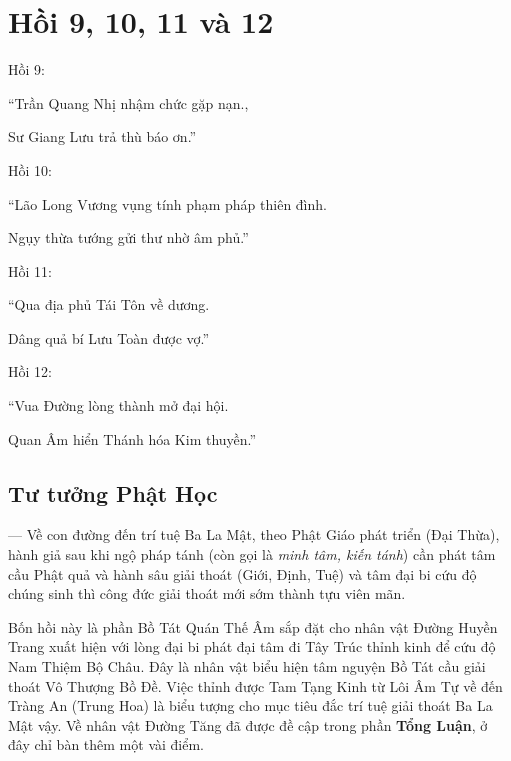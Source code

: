 \chapter{Hồi 9, 10, 11 và 12} %
\label{cha:hoi_9_10_11_và_12}
Hồi 9:

\begin{itshape}
``Trần Quang Nhị nhậm chức gặp nạn.,

Sư Giang Lưu trả thù báo ơn.''
\end{itshape}

Hồi 10:

\begin{itshape}
``Lão Long Vương vụng tính phạm pháp thiên đình.

Ngụy thừa tướng gửi thư nhờ âm phủ.''
\end{itshape}

Hồi 11:

\begin{itshape}
``Qua địa phủ Tái Tôn về dương.

Dâng quả bí Lưu Toàn được vợ.''
\end{itshape}

Hồi 12:

\begin{itshape}
``Vua Đường lòng thành mở đại hội.

Quan Âm hiển Thánh hóa Kim thuyền.''
\end{itshape}

\section{Tư tưởng Phật Học} %
\label{sec:9_phat_hoc}

— Về con đường đến trí tuệ Ba La Mật, theo Phật Giáo phát triển (Đại Thừa), hành giả sau khi ngộ pháp tánh (còn gọi là \emph{minh tâm, kiến tánh}) cần phát tâm cầu Phật quả và hành sâu giải thoát (Giới, Định, Tuệ) và tâm đại bi cứu độ chúng sinh thì công đức giải thoát mới sớm thành tựu viên mãn.

Bốn hồi này là phần Bồ Tát Quán Thế Âm sắp đặt cho nhân vật Đường Huyền Trang xuất hiện với lòng đại bi phát đại tâm đi Tây Trúc thỉnh kinh để cứu độ Nam Thiệm Bộ Châu. Đây là nhân vật biểu hiện tâm nguyện Bồ Tát cầu giải thoát Vô Thượng Bồ Đề. Việc thỉnh được Tam Tạng Kinh từ Lôi Âm Tự về đến Tràng An (Trung Hoa) là biểu tượng cho mục tiêu đắc trí tuệ giải thoát Ba La Mật vậy. Về nhân vật Đường Tăng đã được đề cập trong phần {\bf Tổng Luận}, ở đây chỉ bàn thêm một vài điểm.

